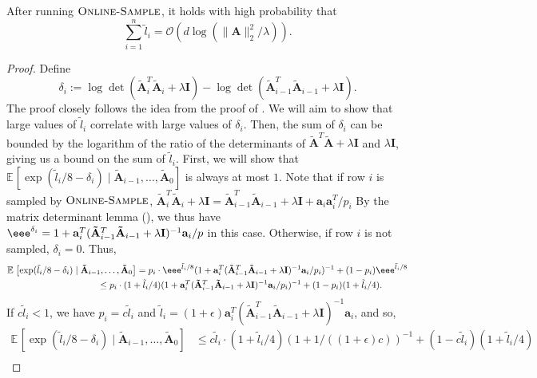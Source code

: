 \documentclass{toc}
\newcommand{\Oh}{\ensuremath{\mathcal{O}}}
\newcommand{\bv}[1]{\mathbf{#1}}
\newcommand{\expct}[3]{\mathbb{E}_{{#1}_{#2}}\left[#3\right]}
\begin{document}
\begin{lemma}
    \label{lem:online-sample-fast}
    After running $\textsc{Online-Sample}$, it holds with high probability that
    $$
        \sum_{i=1}^n \tilde{l}_i = \Oh(d \log(\|\bv{A}\|_2^2 / \lambda)).
    $$
\end{lemma}
\begin{proof}
    Define
    $$
        \delta_i := \log \det(\bv{\tilde{A}}_i^T \bv{\tilde{A}}_i + \lambda \bv{I}) - \log \det(\bv{\tilde{A}}_{i-1}^T \bv{\tilde{A}}_{i-1} + \lambda \bv{I}).
    $$
    The proof closely follows the idea from the proof of .
    We will aim to show that large values of $\tilde{l}_i$ correlate with large values of $\delta_i$.
    Then, the sum of $\delta_i$ can be bounded by the logarithm of the ratio of the determinants of $\bv{\tilde{A}}^T\bv{\tilde{A}} + \lambda\bv{I}$ and $\lambda\bv{I}$, giving us a bound on the sum of $\tilde{l}_i$.
    First, we will show that $\expct{}{}{\exp(\tilde{l}_i/8 - \delta_i) \mid \bv{\tilde A}_{i-1},\ldots, \bv{\tilde A}_{0}}$ is always at most $1$.
   Note that if row $i$ is sampled by $\textsc{Online-Sample}$, $\bv{\tilde{A}}_i^T \bv{\tilde{A}}_i + \lambda \bv{I} =  \bv{\tilde{A}}_{i-1}^T \bv{\tilde{A}}_{i-1} + \lambda \bv{I} + \bv{a}_i \bv{a}_i^T/p_i$
     By the matrix determinant lemma (), we thus have $\eee^{\delta_i} =  1+ \bv{a}_i^T (\bv{\tilde{A}}_{i-1}^T \bv{\tilde{A}}_{i-1} + \lambda \bv{I})^{-1} \bv{a}_i/p$ in this case. Otherwise, if row $i$ is not sampled, $\delta_i = 0$. Thus,
    \begin{align}\label{ok}
        \expct{}{}{\exp(\tilde{l}_i/8 - \delta_i)\mid \bv{\tilde A}_{i-1},\ldots, \bv{\tilde A}_{0}} &= p_i \cdot \eee^{\tilde{l}_i/8} (1 + \bv{a}_i^T (\bv{\tilde{A}}_{i-1}^T \bv{\tilde{A}}_{i-1} + \lambda \bv{I})^{-1} \bv{a}_i / p_i)^{-1} + (1 - p_i) \eee^{\tilde{l}_i/8}\nonumber\\
                                                    &\hspace{-4.3em}\leq p_i \cdot (1 + \tilde{l}_i/4) (1 + \bv{a}_i^T (\bv{\tilde{A}}_{i-1}^T \bv{\tilde{A}}_{i-1} + \lambda \bv{I})^{-1} \bv{a}_i / p_i)^{-1} + (1 - p_i) (1 + \tilde{l}_i/4).
    \end{align}
    If $c\tilde{l}_i < 1$, we have $p_i = c\tilde{l}_i$ and $\tilde{l}_i = (1+\epsilon)\bv{a}_i^T (\bv{\tilde{A}}_{i-1}^T \bv{\tilde{A}}_{i-1} + \lambda \bv{I})^{-1} \bv{a}_i$, and so,
    \begin{align*}
        \expct{}{}{\exp(\tilde{l}_i/8 - \delta_i) \mid \bv{\tilde A}_{i-1},\ldots, \bv{\tilde A}_{0}} &\leq c\tilde{l}_i \cdot (1 +\tilde{l}_i/4) (1 + 1 / ((1+\epsilon)c))^{-1} + (1 - c\tilde{l}_i) (1 + \tilde{l}_i/4)\\

\end{align*}
\end{proof}
\end{document}
